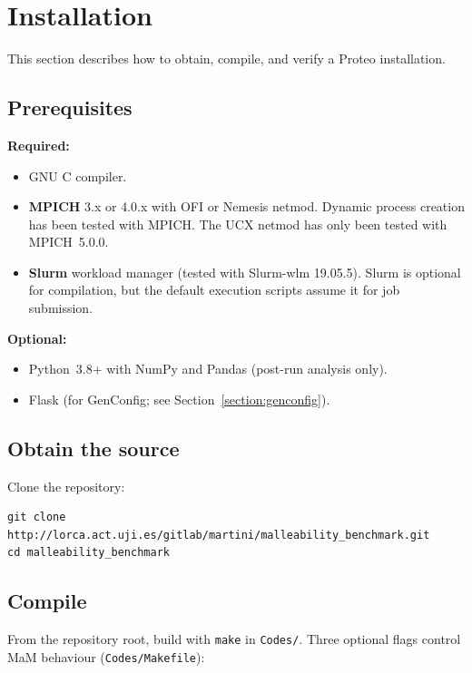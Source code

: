 \section{Installation}
\label{section:installation}

This section describes how to obtain, compile, and verify a Proteo installation.

\subsection{Prerequisites}

\textbf{Required:}
\begin{itemize}
  \item GNU C compiler.
  \item \textbf{MPICH} 3.x or 4.0.x with OFI or Nemesis netmod. Dynamic process creation has been tested with MPICH. The UCX netmod has only been tested with MPICH~5.0.0.
  \item \textbf{Slurm} workload manager (tested with Slurm-wlm 19.05.5). Slurm is optional for compilation, but the default execution scripts assume it for job submission.
\end{itemize}

\textbf{Optional:}
\begin{itemize}
  \item Python~3.8+ with NumPy and Pandas (post-run analysis only).
  \item Flask (for GenConfig; see Section~\ref{section:genconfig}).
\end{itemize}

\subsection{Obtain the source}

Clone the repository:

\begin{lstlisting}[style=bashstyle,caption={Clone Proteo.},captionpos=b]
git clone http://lorca.act.uji.es/gitlab/martini/malleability_benchmark.git
cd malleability_benchmark
\end{lstlisting}

\subsection{Compile}

From the repository root, build with \texttt{make} in \texttt{Codes/}. Three optional flags control MaM behaviour (\texttt{Codes/Makefile}):

